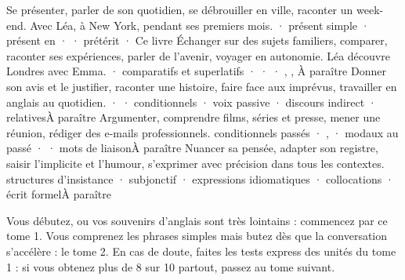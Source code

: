   {Se présenter, parler de son quotidien, se débrouiller en ville, raconter un week-end. Avec Léa,
   à New York, pendant ses premiers mois.}
  { · présent simple · présent en  ·  · prétérit · }{Ce livre}
  {Échanger sur des sujets familiers, comparer, raconter ses expériences, parler de l'avenir,
   voyager en autonomie. Léa découvre Londres avec Emma.}
  { · comparatifs et superlatifs ·  ·  · , , }{À paraître}
  {Donner son avis et le justifier, raconter une histoire, faire face aux imprévus, travailler en
   anglais au quotidien.}
  { ·  · conditionnels · voix passive · discours indirect · relatives}{À paraître}
  {Argumenter, comprendre films, séries et presse, mener une réunion, rédiger des e-mails
   professionnels.}
  {conditionnels passés · ,  · modaux au passé ·  · mots de liaison}{À paraître}
  {Nuancer sa pensée, adapter son registre, saisir l'implicite et l'humour, s'exprimer avec
   précision dans tous les contextes.}
  {structures d'insistance · subjonctif · expressions idiomatiques · collocations · écrit formel}{À paraître}

\begin{astuce}
Vous débutez, ou vos souvenirs d'anglais sont très lointains : commencez par ce tome 1.
Vous comprenez les phrases simples mais butez dès que la conversation s'accélère : le tome 2.
En cas de doute, faites les tests express des unités du tome 1 : si vous obtenez plus de 8 sur 10
partout, passez au tome suivant.
\end{astuce}
